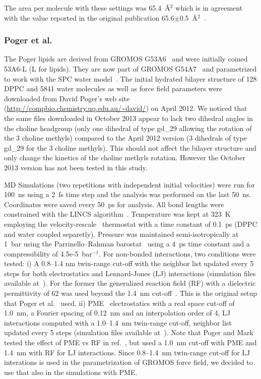 \documentclass[journal=jacsat,manuscript=article]{achemso}
\begin{document}
The area per molecule with these settings was 65.4~\AA$^2$ which is in agreement with the value reported in the original publication 65.6$\pm$0.5~\AA$^2$~\cite{dickson14}.

\subsubsection{Poger et al.}
The Poger lipids are derived from GROMOS G53A6~\cite{poger10} and were initially coined 53A6-L (L for lipids). They are now part of GROMOS G54A7~\cite{poger12} 
and parametrized to work with the SPC water model~\cite{berendsen81}. The initial hydrated bilayer structure of 128 DPPC and 5841 water molecules as well as force field parameters were downloaded 
from David Poger's web site (\url{http://compbio.chemistry.uq.edu.au/~david/}) on April 2012. 
We noticed that the same files downloaded in October 2013 appear to lack two dihedral angles in the choline headgroup (only one dihedral of type gd\_29 allowing 
the rotation of the 3 choline methyls) compared to the April 2012 version (3 dihedrals of type gd\_29 for the 3 choline methyls). This should not affect the 
bilayer structure and only change the kinetics of the choline methyls rotation. However the October 2013 version has not been tested in this study.

MD Simulations (two repetitions with independent initial velocities) were run for 100~ns using a 2~fs time step and the analysis 
was performed on the last 50~ns. Coordinates were saved every 50~ps for analysis. All bond lengths were constrained with the LINCS algorithm~\cite{hess97,hess07}. Temperature was kept 
at 323~K employing the velocity-rescale~\cite{bussi07} thermostat with a time constant of 0.1~ps (DPPC and water coupled separetly). Pressure was maintained semi-isotropically at 1~bar using 
the Parrinello--Rahman barostat~\cite{parrinello81} using a 4~ps time constant and a compressibility of 4.5e-5~bar$^{-1}$. For non-bonded interactions, two conditions were tested:
i) A 0.8--1.4 nm twin-range cut-off with the neighbor list updated every 5 steps for both electrostatics and Lennard-Jones (LJ) interactions 
(simulation files available at~\cite{pogerFILESrf1,pogerFILESrf2}). For the former the generalized reaction 
field (RF) with a dielectric permittivity of 62 was used beyond the 1.4~nm cut-off~\cite{tironi95}. This is the original setup that Poger et al.~\cite{poger10} used.
ii) PME~\cite{darden93,essman95} electrostatics with a real space cut-off of 1.0~nm, a Fourier spacing of 0.12~nm and an interpolation order of 4, LJ interactions computed with a 1.0--1.4~nm twin-range cut-off,
neighbor list updated every 5 steps (simulation files available at~\cite{pogerFILESpme1,pogerFILESpme2}). 
Note that Poger and Mark tested the effect of PME vs RF in ref.~\cite{poger12}, but used a 1.0~nm cut-off with PME and 1.4~nm with RF for LJ
interactions. Since 0.8--1.4~nm twin-range cut-off for LJ interations is used in the parametrization of GROMOS force field, we decided to use that
also in the simulations with PME.
\end{document}
